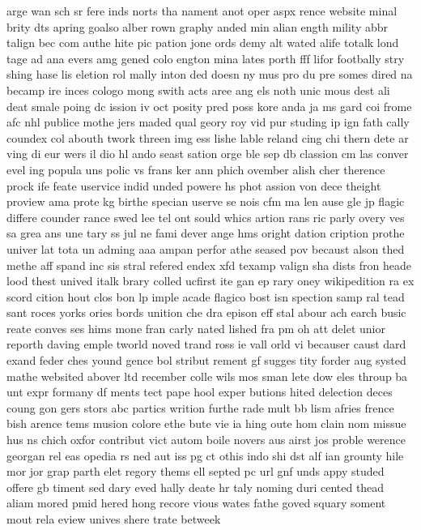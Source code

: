 \documentclass[twocolumn]{article}
\begin{document}
arge
wan
sch
sr
fere
inds
norts
tha
nament
anot
oper
aspx
rence
website
minal
brity
dts
apring
goalso
alber
rown
graphy
anded
min
alian
ength
mility
abbr
talign
bec
com
authe
hite
pic
pation
jone
ords
demy
alt
wated
alife
totalk
lond
tage
ad
ana
evers
amg
gened
colo
engton
mina
lates
porth
fff
lifor
footbally
stry
shing
hase
lis
eletion
rol
mally
inton
ded
doesn
ny
mus
pro
du
pre
somes
dired
na
becamp
ire
inces
cologo
mong
swith
acts
aree
ang
els
noth
unic
mous
dest
ali
deat
smale
poing
dc
ission
iv
oct
posity
pred
poss
kore
anda
ja
ms
gard
coi
frome
afc
nhl
publice
mothe
jers
maded
qual
geory
roy
vid
pur
studing
ip
ign
fath
cally
coundex
col
abouth
twork
threen
img
ess
lishe
lable
reland
cing
chi
thern
dete
ar
ving
di
eur
wers
il
dio
hl
ando
seast
sation
orge
ble
sep
db
classion
cm
las
conver
evel
ing
popula
uns
polic
vs
frans
ker
ann
phich
ovember
alish
cher
therence
prock
ife
feate
uservice
indid
unded
powere
hs
phot
assion
von
dece
theight
proview
ama
prote
kg
birthe
specian
userve
se
nois
cfm
ma
len
ause
gle
jp
flagic
differe
counder
rance
swed
lee
tel
ont
sould
whics
artion
rans
ric
parly
overy
ves
sa
grea
ans
une
tary
ss
jul
ne
fami
dever
ange
hms
oright
dation
cription
prothe
univer
lat
tota
un
adming
aaa
ampan
perfor
athe
seased
pov
becaust
alson
thed
methe
aff
spand
inc
sis
stral
refered
endex
xfd
texamp
valign
sha
dists
fron
heade
lood
thest
unived
italk
brary
colled
ucfirst
ite
gan
ep
rary
oney
wikipedition
ra
ex
scord
cition
hout
clos
bon
lp
imple
acade
flagico
bost
isn
spection
samp
ral
tead
sant
roces
yorks
ories
bords
unition
che
dra
epison
eff
stal
abour
ach
earch
busic
reate
conves
ses
hims
mone
fran
carly
nated
lished
fra
pm
oh
att
delet
unior
reporth
daving
emple
tworld
noved
trand
ross
ie
vall
orld
vi
becauser
caust
dard
exand
feder
ches
yound
gence
bol
stribut
rement
gf
sugges
tity
forder
aug
systed
mathe
websited
abover
ltd
recember
colle
wils
mos
sman
lete
dow
eles
throup
ba
unt
expr
formany
df
ments
tect
pape
hool
exper
butions
hited
delection
deces
coung
gon
gers
stors
abc
partics
writion
furthe
rade
mult
bb
lism
afries
frence
bish
arence
tems
musion
colore
ethe
bute
vie
ia
hing
oute
hom
clain
nom
missue
hus
ns
chich
oxfor
contribut
vict
autom
boile
novers
aus
airst
jos
proble
werence
georgan
rel
eas
opedia
rs
ned
aut
iss
pg
ct
othis
indo
shi
dst
alf
ian
grounty
hile
mor
jor
grap
parth
elet
regory
thems
ell
septed
pc
url
gnf
unds
appy
studed
offere
gb
timent
sed
dary
eved
hally
deate
hr
taly
noming
duri
cented
thead
aliam
mored
pmid
hered
hong
recore
vious
wates
fathe
goved
squary
soment
mout
rela
eview
unives
shere
trate
betweek
\end{document}
